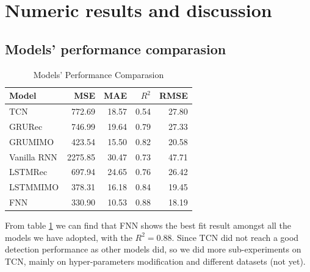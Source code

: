 \section{Numeric results and discussion}

\subsection{Models' performance comparasion}
\begin{table}[H]
\centering
\begin{tabular}{l r r r r}
\toprule
\textbf{Model} & \textbf{MSE} & \textbf{MAE} & \textbf{$R^2$}& \textbf{RMSE}\\
\midrule
TCN & 772.69& 18.57& 0.54& 27.80\\
GRU\-Rec & 746.99& 19.64& 0.79& 27.33 \\
GRU\-MIMO& 423.54& 15.50& 0.82& 20.58 \\
Vanilla RNN& 2275.85& 30.47& 0.73& 47.71 \\
LSTM\-Rec & 697.94& 24.65& 0.76& 26.42 \\
LSTM\-MIMO & 378.31& 16.18& 0.84& 19.45 \\
FNN & 330.90& 10.53& \color{red}0.88& 18.19 \\
\bottomrule
\end{tabular}
\caption{Models' Performance Comparasion}
\label{tab:models}
\end{table}

From table \ref{tab:models} we can find that FNN shows the best fit result amongst all the models we have adopted, with the $R^2 = 0.88$. Since TCN did not reach a good detection performance as other models did, so we did more sub-experiments on TCN, mainly on hyper-parameters modification and different datasets (not yet).


